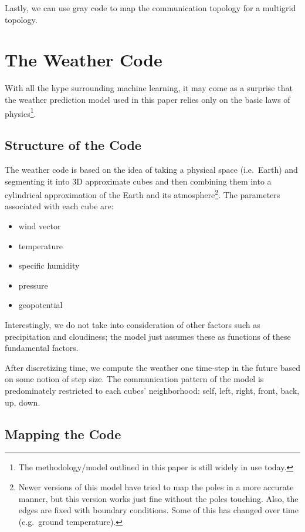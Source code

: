 Lastly, we can use gray code to map the communication topology for a multigrid topology.

\section{The Weather Code}

With all the hype surrounding machine learning, it may come as a surprise that the weather prediction model used in this paper relies only on the basic laws of physics\footnote{The methodology/model outlined in this paper is still widely in use today.}.

\subsection{Structure of the Code}

The weather code is based on the idea of taking a physical space (i.e.\ Earth) and segmenting it into 3D approximate cubes and then combining them into a cylindrical approximation of the Earth and its atmosphere\footnote{Newer versions of this model have tried to map the poles in a more accurate manner, but this version works just fine without the poles touching. Also, the edges are fixed with boundary conditions.
Some of this has changed over time (e.g.\ ground temperature).}. The parameters associated with each cube are:

\begin{itemize}
    \item wind vector
    \item temperature
    \item specific humidity
    \item pressure
    \item geopotential
\end{itemize}

Interestingly, we do not take into consideration of other factors such as precipitation and cloudiness; the model just assumes these as functions of these fundamental factors.

After discretizing time, we compute the weather one time-step in the future based on some notion of step size. The communication pattern of the model is predominately restricted to each cubes' neighborhood: self, left, right, front, back, up, down.

\subsection{Mapping the Code}

